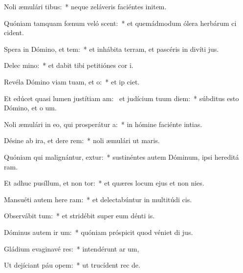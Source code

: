 \item Noli æmulári  tibus:~* neque zeláveris faciéntes initem.
\item Quóniam tamquam fœnum veló scent:~* et quemádmodum ólera herbárum ci cident.
\item Spera in Dómino, et  tem:~* et inhábita terram, et pascéris in divíti jus.
\item Delec  mino:~* et dabit tibi petitiónes cor i.
\item Revéla Dómino viam tuam, et   o:~* et ip ciet.
\item Et edúcet quasi lumen justítiam am:~\pscross{} et judícium tuum  diem:~* súbditus esto Dómino, et o um.
\item Noli æmulári in eo, qui prosperátur   a:~* in hómine faciénte intias.
\item Désine ab ira, et dere rem:~* noli æmulári ut maris.
\item Quóniam qui malignántur, extur:~* sustinéntes autem Dóminum, ipsi hereditá ram.
\item Et adhuc pusíllum, et non  tor:~* et quæres locum ejus et non nies.
\item Mansuéti autem here ram:~* et delectabúntur in multitúdi cis.
\item Observábit  tum:~* et stridébit super eum dénti is.
\item Dóminus autem ir um:~* quóniam próspicit quod véniet di jus.
\item Gládium evaginavé res:~* intendérunt ar um,
\item Ut dejíciant páu  opem:~* ut trucídent rec de.

